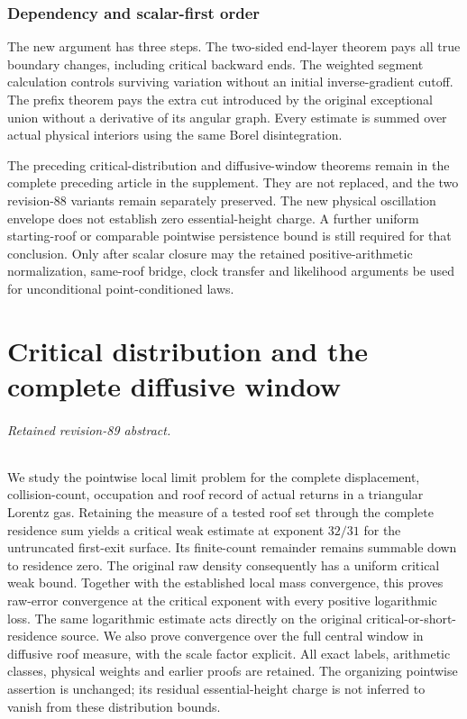 \documentclass[11pt,reqno]{amsart}
\numberwithin{equation}{section}
\theoremstyle{definition}\newtheorem{definition}[theorem]{Definition}
\theoremstyle{remark}\newtheorem{remark}[theorem]{Remark}
\theoremstyle{definition}\newtheorem{inputstatement}[theorem]{Input statement}
\begin{document}
\section{Dependency and scalar-first order}
The new argument has three steps. The two-sided end-layer theorem pays
all true boundary changes, including critical backward ends. The
weighted segment calculation controls surviving variation without an
initial inverse-gradient cutoff. The prefix theorem pays the extra
cut introduced by the original exceptional union without a derivative
of its angular graph. Every estimate is summed over actual physical
interiors using the same Borel disintegration.

The preceding critical-distribution and diffusive-window theorems remain
in the complete preceding article in the supplement. They are not
replaced, and the two revision-88 variants remain separately preserved.
The new physical oscillation envelope does not establish zero
essential-height charge. A further uniform starting-roof or comparable
pointwise persistence bound is still required for that conclusion.
Only after scalar closure may the retained positive-arithmetic
normalization, same-roof bridge, clock transfer and likelihood arguments
be used for unconditional point-conditioned laws.


\endgroup
\part{Critical distribution and the complete diffusive window}
\begingroup
\let\ArchiveLabel\label
\let\ArchiveRef\ref
\renewcommand{\label}[1]{\ArchiveLabel{v89archive:#1}}
\renewcommand{\ref}[1]{%
  \IfBeginWith{#1}{supp-}{%
    \StrBehind{#1}{supp-}[\ArchiveTarget]%
    \ArchiveRef{\ArchiveTarget}%
  }{\ArchiveRef{v89archive:#1}}%
}
\makeatletter
\let\ltx@label\label
\makeatother
\paragraph{Retained revision-89 abstract.}

We study the pointwise local limit problem for the complete displacement,
collision-count, occupation and roof record of actual returns in a
triangular Lorentz gas. Retaining the measure of a tested roof set
through the complete residence sum yields a critical weak estimate
at exponent $32/31$ for the untruncated first-exit surface. Its
finite-count remainder remains summable down to residence zero.
The original raw density consequently has a uniform critical weak
bound. Together with the established local mass convergence, this
proves raw-error convergence at the critical exponent with every
positive logarithmic loss. The same logarithmic estimate acts directly
on the original critical-or-short-residence source. We also prove
convergence over the full central window in diffusive roof measure,
with the scale factor explicit. All exact labels, arithmetic classes,
physical weights and earlier proofs are retained. The organizing
pointwise assertion is unchanged; its residual essential-height
charge is not inferred to vanish from these distribution bounds.
\end{document}
